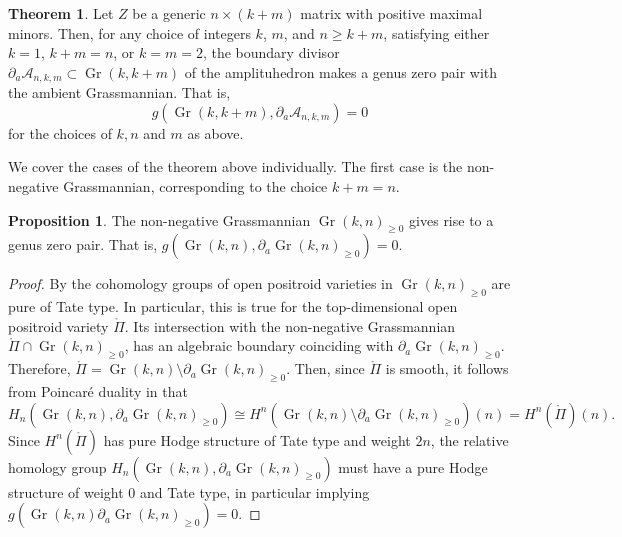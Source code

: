 \documentclass[12pt]{extarticle}
\theoremstyle{definition}
\theoremstyle{theorem}
\newtheorem{proposition}[definition]{Proposition}
\newtheorem{theorem}[definition]{Theorem}
\theoremstyle{remark}
\numberwithin{equation}{section}
\DeclareMathOperator{\gr}{Gr}
\newcommand{\aA}{\mathcal{A}}
\begin{document}
\begin{theorem}\label{thm:amplituhedra_genus_zero}
    Let $Z$ be a generic $n\times (k+m)$ matrix with positive maximal minors.
    Then, for any choice of integers $k$, $m$, and $n\geq k+m$, satisfying either $k=1$, $k+m=n$, or $k=m=2$, the boundary divisor $\partial_a\aA_{n,k,m}\subset \gr(k,k+m)$ of the amplituhedron makes a genus zero pair with the ambient Grassmannian.
    That is, 
    \[
    g(\gr(k,k+m),\partial_a\aA_{n,k,m})=0
    \]
    for the choices of $k,n$ and $m$ as above.
\end{theorem}

We cover the cases of the theorem above individually.
The first case is the non-negative Grassmannian, corresponding to the choice $k+m=n$.

\begin{proposition}\label{prop:nonnegGrass_genus_zero}
    The non-negative Grassmannian $\gr(k,n)_{\geq 0}$ gives rise to a genus zero pair. That is, $g(\gr(k,n),\partial_a\gr(k,n)_{\geq 0})=0$.
\end{proposition}
\begin{proof}
    By \cite[Corollary 4.13]{galashin_positroid_hodge} the cohomology groups of open positroid varieties in $\gr(k,n)_{\geq 0}$ are pure of Tate type.
    In particular, this is true for the top-dimensional open positroid variety $\mathring \Pi$. Its intersection with the non-negative Grassmannian $\mathring\Pi\cap \gr(k,n)_{\geq 0}$, has an algebraic boundary coinciding with $\partial_a\gr(k,n)_{\geq 0}$.
    Therefore, $\mathring \Pi=\gr(k,n)\setminus\partial_a\gr(k,n)_{\geq 0} $.
    Then, since $\mathring \Pi$ is smooth, it follows from Poincaré duality in \cite[Equation (16)]{brown-dupont} that 
    \[
    H_n(\gr(k,n),\partial_a\gr(k,n)_{\geq 0})\cong H^n(\gr(k,n)\setminus\partial_a\gr(k,n)_{\geq 0})(n)=H^n(\mathring\Pi)(n).
    \]
    Since $H^n(\mathring \Pi)$ has pure Hodge structure of Tate type and weight $2n$, the relative homology group $H_n(\gr(k,n),\partial_a\gr(k,n)_{\geq 0})$ must have a pure Hodge structure of weight $0$ and Tate type, in particular implying $g(\gr(k,n)\partial_a\gr(k,n)_{\geq 0})=0$.
\end{proof}
\end{document}
